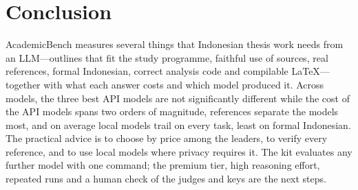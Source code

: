 \section{Conclusion}
\label{sec:conclusion}

AcademicBench measures several things that Indonesian thesis work needs from an LLM---outlines that fit the study programme, faithful use of sources, real references, formal Indonesian, correct analysis code and compilable LaTeX---together with what each answer costs and which model produced it. Across \NModels{} models, the three best API models are not significantly different while the cost of the API models spans two orders of magnitude, references separate the models most, and on average local models trail on every task, least on formal Indonesian. The practical advice is to choose by price among the leaders, to verify every reference, and to use local models where privacy requires it. The kit evaluates any further model with one command; the premium tier, high reasoning effort, repeated runs and a human check of the judges and keys are the next steps.
